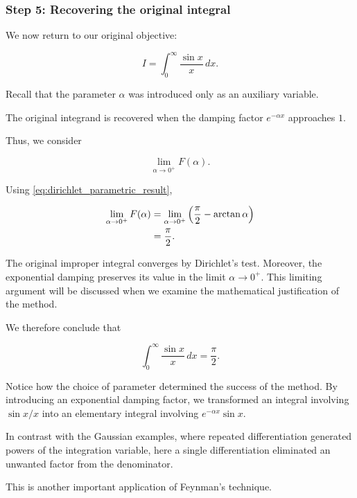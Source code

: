 \documentclass[11pt,a4paper]{article}
\theoremstyle{definition}
\theoremstyle{remark}
\begin{document}
\subsubsection*{Step 5: Recovering the original integral}

We now return to our original
objective:

\[
    I=
    \int_0^\infty\frac{\sin x}{x}\,dx.
\]

Recall that the parameter
$\alpha$ was introduced only
as an auxiliary variable.

The original integrand is
recovered when the damping
factor $e^{-\alpha x}$
approaches $1$.

Thus, we consider

\[
    \lim_{\alpha\to0^+}F(\alpha).
\]

Using
\eqref{eq:dirichlet_parametric_result},

\begin{align}
    \lim_{\alpha\to0^+}F(\alpha)
    &=
    \lim_{\alpha\to0^+}
    \left(
    \frac{\pi}{2}-\arctan\alpha
    \right)
    \notag\\
    &=
    \frac{\pi}{2}.
\end{align}

The original improper integral
converges by Dirichlet's test.
Moreover, the exponential
damping preserves its value
in the limit $\alpha\to0^+$.
This limiting argument will
be discussed when we examine
the mathematical justification
of the method.

We therefore conclude that

\begin{equation}
    \boxed{
    \int_0^\infty
    \frac{\sin x}{x}\,dx
    =
    \frac{\pi}{2}.
    }
    \label{eq:dirichlet_final}
\end{equation}

\medskip

Notice how the choice of parameter
determined the success of the method.
By introducing an exponential
damping factor, we transformed
an integral involving $\sin x/x$
into an elementary integral
involving $e^{-\alpha x}\sin x$.

In contrast with the Gaussian
examples, where repeated
differentiation generated powers
of the integration variable,
here a single differentiation
eliminated an unwanted factor
from the denominator.

This is another important
application of Feynman's technique.

\end{document}
